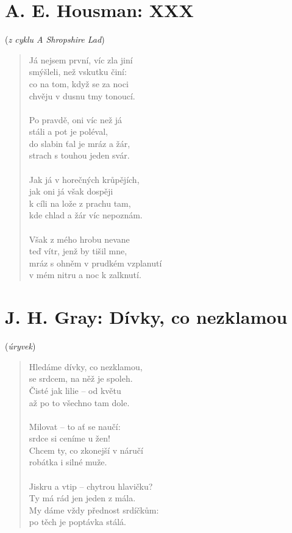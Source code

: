 \section{A. E. Housman: XXX}
(\textit{z cyklu A Shropshire Lad})
\medskip
\begin{verse}
Já nejsem první, víc zla jiní \\
smýšleli, než vskutku činí: \\
co na tom, když se za noci \\
chvěju v dusnu tmy tonoucí. \\
 ~\\
Po pravdě, oni víc než já  \\
stáli a pot je poléval,         \\
do slabin ťal je mráz a žár, \\
strach s touhou jeden svár. \\
 ~\\
Jak já v horečných krůpějích, \\
jak oni já však dospěji \\
k cíli na lože z prachu tam, \\
kde chlad a žár víc nepoznám. \\
 ~\\
Však z mého hrobu nevane \\
teď vítr, jenž by tišil mne, \\
mráz s ohněm v prudkém vzplanutí \\
v mém nitru a noc k zalknutí. 

\end{verse}


\section{J. H. Gray: Dívky, co nezklamou}
(\textit{úryvek})
\medskip
\begin{verse}
Hledáme dívky, co nezklamou, \\
se srdcem, na něž je spoleh. \\
Čisté jak lilie -- od květu \\
až po to všechno tam dole. \\
~\\
Milovat -- to ať se naučí: \\
srdce si ceníme u žen! \\
Chcem ty, co zkonejší v náručí \\
robátka i silné muže. \\
~\\
Jiskru a vtip -- chytrou hlavičku? \\
Ty má rád jen jeden z mála.  \\
My dáme vždy přednost srdíčkům: \\
po těch je poptávka stálá. 
 

\end{verse}